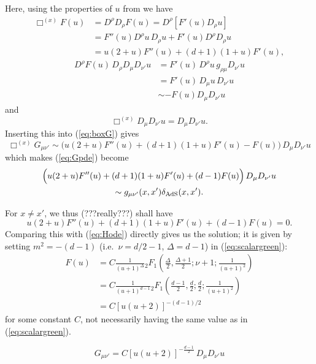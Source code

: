 Here, using the properties of $u$ from  we have
\begin{equation*}
\begin{split}
\Box^{(x)} F(u) &= D^\rho D_\rho F(u) = D^\rho \left[ F'(u) D_\rho u \right] \\
&= F''(u) D^\rho u\, D_\rho u + F'(u) D^\rho D_\rho u \\
&= u (2+u) F''(u) + (d+1)(1+u) F'(u),
\end{split}
\end{equation*}
\begin{equation*}
\begin{split}
D^\rho F(u)\, D_\rho D_\mu D_{\nu'} u &= F'(u)\, D^\rho u\, g_{\rho\mu} D_{\nu'} u \\
&= F'(u)\, D_\mu u\, D_{\nu'} u \\
&\sim -F(u) D_\mu D_{\nu'} u
\end{split}
\end{equation*}
and
$$\Box^{(x)} D_\mu D_{\nu'} u = D_\mu D_{\nu'} u.$$
Inserting this into (\ref{eq:boxG}) gives
$$\Box^{(x)}G_{\mu\nu'} \sim \Big( u(2+u) F''(u) + (d+1)(1+u) F'(u) - F(u) \Big)\, D_\mu D_{\nu'} u$$
which makes (\ref{eq:Gpde}) become
\begin{multline*}
\Big( u(2+u) F''(u) + (d+1)(1+u) F'(u) +(d-1) F(u) \Big)\, D_\mu D_{\nu'} u \\
\sim g_{\mu\nu'}(x,x') \delta_{\mathrm{AdS}}(x,x').
\end{multline*}

For $x \neq x'$, we thus (???really???) shall have
$$u(2+u) F''(u) + (d+1)(1+u) F'(u) + (d-1) F(u) = 0.$$
Comparing this with (\ref{eq:Hode}) directly gives us the solution; it is given by setting $m^2 = -(d-1)$ (i.e.\ $\nu=d/2-1$, $\Delta = d-1$) in (\ref{eq:scalargreen}):
\begin{equation*}
\begin{split}
F(u) &= C \frac{1}{(u+1)^\Delta} {}_2F_1 \left( \frac{\Delta}{2}, \frac{\Delta+1}{2}; \nu+1; \frac{1}{(u+1)^2} \right) \\
&= C \frac{1}{(u+1)^{d-1}} {}_2F_1 \left( \frac{d-1}{2}, \frac{d}{2}; \frac{d}{2}; \frac{1}{(u+1)^2} \right) \\
&= C [u(u+2)]^{-(d-1)/2}
\end{split}
\end{equation*}
for some constant $C$, not necessarily having the same value as in (\ref{eq:scalargreen}).

$$G_{\mu\nu'} = C [u(u+2)]^{-\frac{d-1}{2}}\, D_\mu D_{\nu'} u$$
